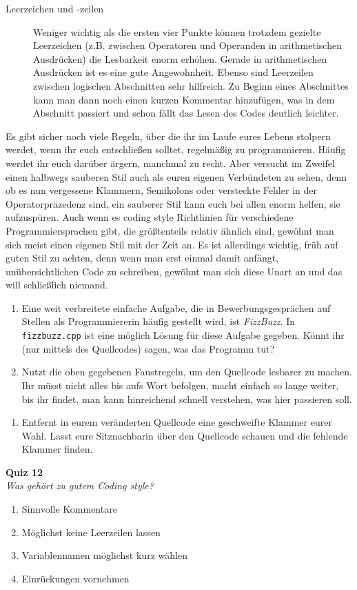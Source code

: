 \begin{description}
	\item[Leerzeichen und -zeilen]
	      Weniger wichtig als die ersten vier Punkte können trotzdem gezielte
	      Leerzeichen (z.B. zwischen Operatoren und Operanden in arithmetischen
	      Ausdrücken) die Lesbarkeit enorm erhöhen. Gerade in arithmetischen
	      Ausdrücken ist es eine gute Angewohnheit.
	      Ebenso sind Leerzeilen zwischen logischen Abschnitten sehr hilfreich. Zu Beginn eines Abschnittes kann man dann noch einen kurzen Kommentar hinzufügen, was in dem Abschnitt passiert und schon fällt das Lesen des Codes deutlich leichter.
\end{description}

Es gibt sicher noch viele Regeln, über die ihr im Laufe eures Lebens stolpern
werdet, wenn ihr euch entschließen solltet, regelmäßig zu programmieren. Häufig
werdet ihr euch darüber ärgern, manchmal zu recht. Aber versucht im Zweifel
einen halbwegs sauberen Stil auch als euren eigenen Verbündeten zu sehen, denn
ob es nun vergessene Klammern, Semikolons oder versteckte Fehler in der
Operatorpräzedenz sind, ein sauberer Stil kann euch bei allen enorm helfen, sie
aufzuspüren. Auch wenn es coding style Richtlinien für verschiedene Programmiersprachen gibt, die größtenteils relativ ähnlich sind, gewöhnt man sich meist einen eigenen Stil mit der Zeit an. Es ist allerdings wichtig, früh auf guten Stil zu achten, denn wenn man erst einmal damit anfängt, unübersichtlichen Code zu schreiben, gewöhnt man sich diese Unart an und das will schließlich niemand.

\begin{praxis}
	\begin{enumerate}
		\item Eine weit verbreitete einfache Aufgabe, die in Bewerbungsgesprächen
		      auf Stellen als Programmiererin häufig gestellt wird, ist
		      \emph{FizzBuzz}. In \texttt{fizzbuzz.cpp} ist eine möglich Lösung für
		      diese Aufgabe gegeben. Könnt ihr (nur mittels des Quellcodes) sagen,
		      was das Programm tut?
		\item Nutzt die oben gegebenen Faustregeln, um den Quellcode lesbarer zu
		      machen. Ihr müsst nicht alles bis aufs Wort befolgen, macht einfach so
		      lange weiter, bis ihr findet, man kann hinreichend schnell verstehen,
		      was hier passieren soll.
	\end{enumerate}

\end{praxis}

\begin{spiel}
	\begin{enumerate}
		\item Entfernt in eurem veränderten Quellcode eine geschweifte Klammer
		      eurer Wahl. Lasst eure Sitznachbarin über den Quellcode schauen und die
		      fehlende Klammer finden.
	\end{enumerate}
\end{spiel}

\textbf{Quiz 12}\\
\textit{Was gehört zu gutem Coding style?}
\begin{enumerate}[label=\alph*)]
	\item Sinnvolle Kommentare
	\item Möglichst keine Leerzeilen lassen
	\item Variablennamen möglichst kurz wählen
	\item Einrückungen vornehmen
\end{enumerate}

